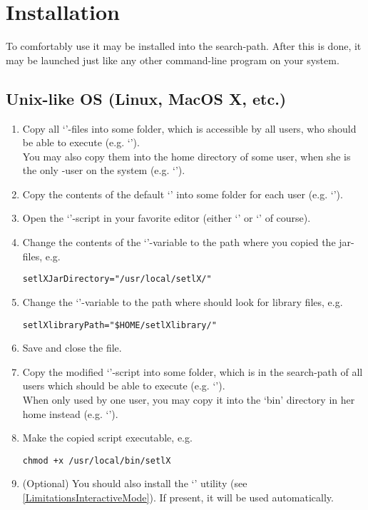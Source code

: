 \section{Installation}

To comfortably use \setlX{} it may be installed into the search-path. After this is done, it may be launched just like any other command-line program on your system.

\subsection{Unix-like OS (Linux, MacOS X, etc.)}

\begin{enumerate}
	\item Copy all `'-files into some folder, which is accessible by all users, who should be able to execute \setlX{} (e.g. `').\\
	You may also copy them into the home directory of some user, when she is the only \setlX-user on the system (e.g. `').
	\item Copy the contents of the default `' into some folder for each user (e.g. `').
	\item Open the `'-script in your favorite editor (either `' or `' of course).
	\item Change the contents of the `'-variable to the path where you copied the jar-files, e.g.
\begin{lstlisting}[frame=none,numbers=none]
setlXJarDirectory="/usr/local/setlX/"
\end{lstlisting}
	\item Change the `'-variable to the path where \setlX{} should look for library files, e.g.
\begin{lstlisting}[frame=none,numbers=none]
setlXlibraryPath="$HOME/setlXlibrary/"
\end{lstlisting}
	\item Save and close the file.
	\item Copy the modified `'-script into some folder, which is in the search-path of all users which should be able to execute \setlX{} (e.g. `').\\
	When only used by one user, you may copy it into the `bin' directory in her home instead (e.g. `').
	\item Make the copied script executable, e.g.
\begin{lstlisting}[frame=none,numbers=none]
chmod +x /usr/local/bin/setlX
\end{lstlisting}
	\item (Optional) You should also install the `' utility (see \ref{LimitationsInteractiveMode}). If present, it will be used automatically.

\end{enumerate}

